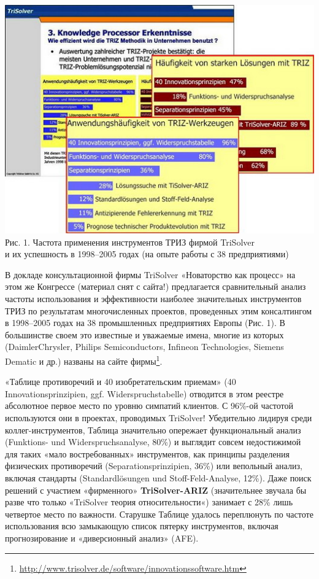 \documentclass[11pt,a4paper]{article}
\begin{document}
\begin{center}
  \includegraphics[width=.8\textwidth]{./2.jpg} \\
Рис. 1. Частота применения инструментов ТРИЗ фирмой TriSolver\\ и их успешность
в 1998--2005 годах (на опыте работы с 38 предприятиями)
\end{center}

В докладе консультационной фирмы TriSolver «Новаторство как процесс» на этом
же Конгрессе \cite{Livotov2005} (материал снят с сайта!)  предлагается
сравнительный анализ частоты использования и эффективности наиболее
значительных инструментов ТРИЗ по результатам многочисленных проектов,
проведенных этим консалтингом в 1998--2005 годах на 38 промышленных
предприятиях Европы (Рис. 1). В большинстве своем это известные и уважаемые
имена, многие из которых (DaimlerChrysler, Philips Semiconductors, Infineon
Technologies, Siemens Dematic и др.) названы на сайте
фирмы\footnote{\url{http://www.trisolver.de/software/innovationssoftware.htm}}.

«Таблице противоречий и 40 изобретательским приемам» (40
Innovationsprinzipien, ggf. Widerspruchstabelle) отводится в этом реестре
абсолютное первое место по уровню симпатий клиентов. С 96\%-ой частотой
используются они в проектах, проводимых TriSolver! Убедительно лидируя среди
коллег-инструментов, Таблица значительно опережает функциональный анализ
(Funktions- und Widerspruchsanalyse, 80\%) и выглядит совсем недостижимой для
таких «мало востребованных» инструментов, как принципы разделения физических
противоречий (Separationsprinzipien, 36\%) или вепольный анализ, включая
стандарты (Standardl\"osungen und Stoff-Feld-Analyse, 12\%). Даже поиск
решений с участием «фирменного» \textbf{TriSolver-ARIZ} (значительнее звучала
бы разве что только «TriSolver теория относительности«) занимает с 28\% лишь
четвертое место по важности. Старушке Таблице удалось переплюнуть по частоте
использования всю замыкающую список пятерку инструментов, включая
прогнозирование и «диверсионный анализ» (AFE).
\end{document}
